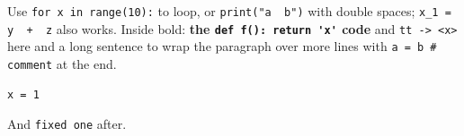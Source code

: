 \documentclass{article}
\begin{document}
Use \lstinline|for x in range(10):| to loop, or \lstinline{print("a  b")} with double spaces; \lstinline!x_1 = y  +  z! also works.
Inside bold: \textbf{the \lstinline|def f(): return 'x'| code} and \lstinline[basicstyle=\ttfamily]|tt -> <x>| here and a long sentence to wrap the paragraph over more lines with \lstinline|a = b # comment| at the end.
\begin{lstlisting}
x = 1
\end{lstlisting}
And \lstinline[columns=fixed]|fixed one| after.
\end{document}
